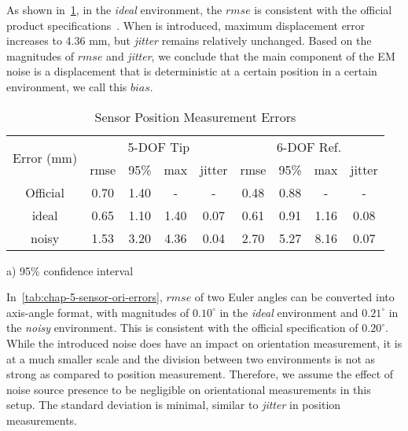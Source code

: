 As shown in~\cref{tab:chap-5-sensor-pos-errors}, in the \textit{ideal} environment, the $rmse$ is consistent with the official product specifications~\parencite{AuroraNDIsPremier2024}. When  is introduced, maximum displacement error increases to 4.36 mm, but \textit{jitter} remains relatively unchanged. Based on the magnitudes of $rmse$ and \textit{jitter}, we conclude that the main component of the EM noise is a displacement that is deterministic at a certain position in a certain environment, we call this $bias$.

\begin{table}[]
\centering
\caption{Sensor Position Measurement Errors}
\label{tab:chap-5-sensor-pos-errors}
\begin{tabular}{c|cccc|cccc}
\toprule
\multirow{2}{*}{Error (mm)} & \multicolumn{4}{c|}{5-DOF Tip} & \multicolumn{4}{c}{6-DOF Ref.} \\
                            & rmse  & 95\%  & max   & jitter & rmse  & 95\%  & max   & jitter \\ \hline
Official                    & 0.70  & 1.40  & -     & -      & 0.48  & 0.88  & -     & -      \\
ideal                       & 0.65  & 1.10  & 1.40  & 0.07   & 0.61  & 0.91  & 1.16  & 0.08   \\
noisy                       & 1.53  & 3.20  & 4.36  & 0.04   & 2.70  & 5.27  & 8.16  & 0.07   \\
\bottomrule
\end{tabular}
\par\smallskip
 \parbox{\columnwidth}{\raggedright\small
    a) 95\% confidence interval}
\end{table}

In~\cref{tab:chap-5-sensor-ori-errors}, $rmse$ of two Euler angles can be converted into axis-angle format, with magnitudes of $0.10^\circ$ in the \textit{ideal} environment and $0.21^\circ$ in the \textit{noisy} environment. This is consistent with the official specification of $0.20^\circ$. While the introduced noise does have an impact on orientation measurement, it is at a much smaller scale and the division between two environments is not as strong as compared to position measurement. Therefore, we assume the effect of noise source presence to be negligible on orientational measurements in this setup. The standard deviation is minimal, similar to \textit{jitter} in position measurements.

